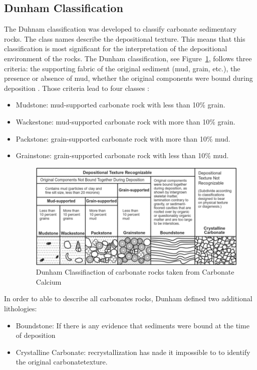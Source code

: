 \subsection{Dunham Classification}
The Duhnam classification was developed to classify carbonate sedimentary rocks. The class names describe the depositional texture. This means that this classification is most significant for the interpretation of the depositional environment of the rocks. The Dunham classification, see Figure~\ref{fig:dunham}, follows three criteria: the supporting fabric of the original sediment (mud, grain, etc.), the presence or absence of mud, whether the original components were bound during deposition \cite{dunhamrevised}.
Those criteria lead to four classes :
\begin{itemize}
    \item Mudstone: mud-supported carbonate rock with less than 10\% grain.
    \item Wackestone: mud-supported carbonate rock with more than 10\% grain.
    \item Packstone: grain-supported carbonate rock with more than 10\% mud.
    \item Grainstone: grain-supported carbonate rock with less than 10\% mud.
	\begin{figure}[!htp]
    \centering
        \includegraphics[width=1\textwidth]{figures/02-Dunhams-classification}
        \caption[Dunham Classifcation]{Dunham Classifiaction of carbonate rocks taken from Carbonate Calcium \cite{dunhamfig}}\label{fig:dunham}
    \end{figure}
\end{itemize}
In order to able to describe all carbonates rocks, Dunham defined two additional lithologies: 
\begin{itemize}
    \item Boundstone: If there is any evidence that sediments were bound at the time of deposition
    \item Crystalline Carbonate: recrystallization has nade it impossible to to identify the original carbonatetexture.
\end{itemize}

